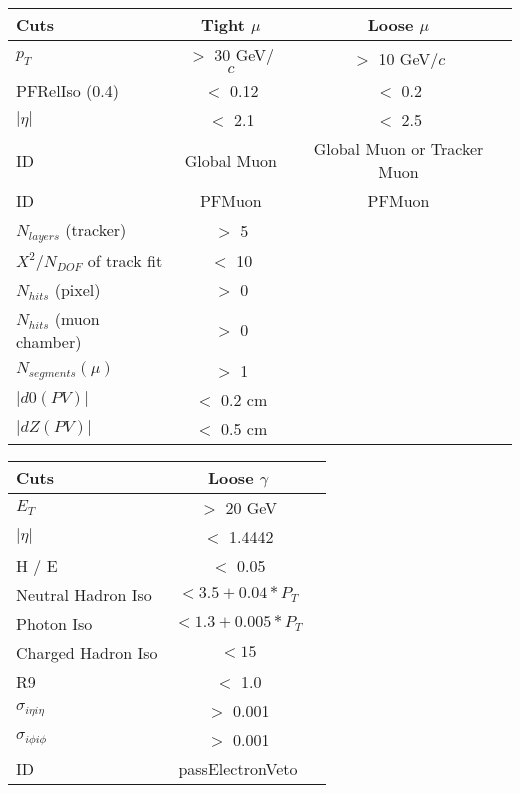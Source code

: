 \documentclass[landscape]{article}
\begin{document}
\begin{small}
\begin{center}
    \vspace{10 mm}

    \begin{tabular}{ | l | c | c | }
      \hline \hline
      Cuts & Tight $\mu$ & Loose $\mu$ \\ \hline
      $p_{T}$ & $>$ 30 GeV/$c$ & $>$ 10 GeV/$c$ \\ \hline
      PFRelIso (0.4) & $<$ 0.12 & $<$ 0.2 \\ \hline
      $|\eta|$ & $<$ 2.1 & $<$ 2.5 \\ \hline
      ID & Global Muon & Global Muon or Tracker Muon \\ \hline
      ID & PFMuon & PFMuon \\ \hline
      $N_{layers}$ (tracker) & $>$ 5 & \\ \hline
      $X^{2} / N_{DOF}$ of track fit & $<$ 10 & \\ \hline
      $N_{hits}$ (pixel) & $>$ 0 & \\ \hline
      $N_{hits}$ (muon chamber) & $>$ 0 & \\ \hline
      $N_{segments}(\mu)$ & $>$ 1 & \\ \hline
      $|d0(PV)|$ & $<$ 0.2 cm & \\ \hline
      $|dZ(PV)|$ & $<$ 0.5 cm & \\
      \hline \hline
    \end{tabular}

    \vspace{10 mm}

    \begin{tabular}{ | l | c | c | }
      \hline \hline
      Cuts & Loose $\gamma$ \\ \hline
      $E_{T}$ & $>$ 20 GeV \\ \hline
      $|\eta|$ & $<$ 1.4442 \\ \hline
      H / E & $<$ 0.05 \\ \hline
      Neutral Hadron Iso & $< 3.5 + 0.04*P_{T}$ \\ \hline
      Photon Iso & $< 1.3 + 0.005*P_{T}$ \\ \hline
      Charged Hadron Iso & $< 15$ \\ \hline
      R9 & $<$ 1.0 \\ \hline
      $\sigma_{i\eta i\eta}$ & $>$ 0.001 \\ \hline
      $\sigma_{i\phi i\phi}$ & $>$ 0.001 \\ \hline
      ID & passElectronVeto \\
      \hline \hline
    \end{tabular}


\end{center}
\end{small}
\end{document}
